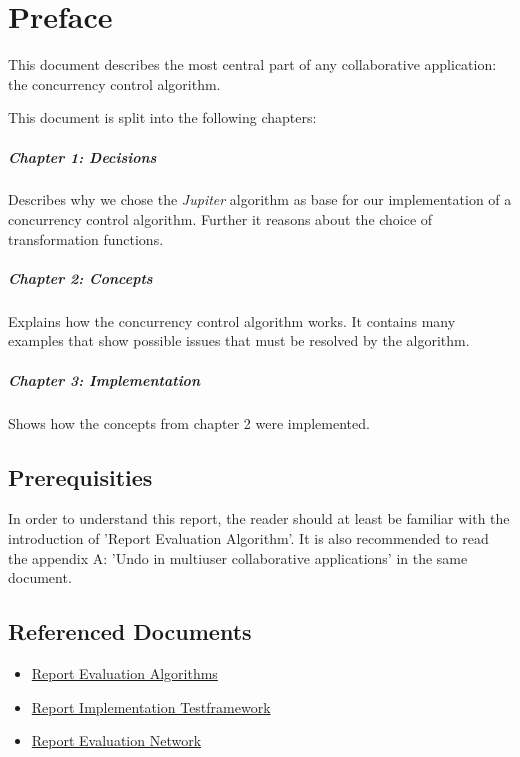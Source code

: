 \chapter*{Preface}
This document describes the most central part of any collaborative application: the concurrency control algorithm.

This document is split into the following chapters:

\paragraph{Chapter 1: Decisions} Describes why we chose the \emph{Jupiter} algorithm as base for our implementation of a concurrency control algorithm. Further it reasons about the choice of transformation functions.

\paragraph{Chapter 2: Concepts} Explains how the concurrency control algorithm works. It contains many examples that show possible issues that must be resolved by the algorithm.

\paragraph{Chapter 3: Implementation} Shows how the concepts from chapter 2 were implemented.

\section*{Prerequisities}
In order to understand this report, the reader should at least be familiar with the introduction of 'Report Evaluation Algorithm'. It is also recommended to read the appendix A: 'Undo in multiuser collaborative applications' in the same document.

\section*{Referenced Documents}
\begin{itemize}
 \item \href{http://ace.iserver.ch:81/repos/ace/ace/trunk/docs/pdf/algorithm.pdf}{Report Evaluation Algorithms}
 \item \href{http://ace.iserver.ch:81/repos/ace/ace/trunk/docs/pdf/testframework.pdf}{Report Implementation Testframework}
 \item \href{http://ace.iserver.ch:81/repos/ace/ace/trunk/docs/pdf/network.pdf}{Report Evaluation Network}
\end{itemize}
